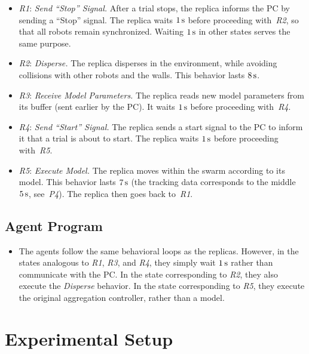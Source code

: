 \begin{itemize}
\item \textit{R1}: \textit{Send ``Stop'' Signal.} After a trial stops, the replica informs the PC by sending a ``Stop'' signal. The replica waits $\unit[1]{s}$ before proceeding with~\textit{R2}, so that all robots remain synchronized. Waiting $\unit[1]{s}$ in other states serves the same purpose. %

\item\textit{R2}: \textit{Disperse.} The replica disperses in the environment, while avoiding collisions with other robots and the walls. This behavior lasts $\unit[8]{s}$.

\item\textit{R3}: \textit{Receive Model Parameters.} The replica reads new model parameters from its buffer (sent earlier by the PC). It waits $\unit[1]{s}$ before proceeding with~\textit{R4}.

\item\textit{R4}: \textit{Send ``Start'' Signal.} The replica sends a start signal to the PC to inform it that a trial is about to start. The replica waits $\unit[1]{s}$ before proceeding with~\textit{R5}.

\item\textit{R5}: \textit{Execute Model.} The replica moves within the swarm according to its model. This behavior lasts $\unit[7]{s}$ (the tracking data corresponds to the middle $\unit[5]{s}$, see~\textit{P4}). The replica then goes back to~\textit{R1}.
\end{itemize}

\subsection{Agent Program}

\begin{itemize}
\item The agents follow the same behavioral loops as the replicas. However, in the states analogous to \textit{R1}, \textit{R3}, and \textit{R4}, they simply wait $\unit[1]{s}$ rather than communicate with the PC. In the state corresponding to \textit{R2}, they also execute the \textit{Disperse} behavior. In the state corresponding to \textit{R5}, they execute the original aggregation controller, rather than a model.
\end{itemize}

\section{Experimental Setup}\label{sec:experimental_setup_swarm_physical}

